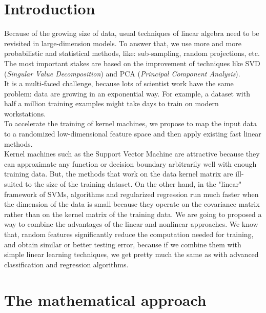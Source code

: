 \documentclass{article}
\begin{document}
\sloppy
{}


\section{Introduction}
Because of the growing size of data, usual techniques of linear algebra need to be revisited in large-dimension models. To answer that, we use more and more probabilistic and statistical methods, like: sub-sampling, random projections, etc. The most important stakes are based on the improvement of techniques like SVD (\textit{Singular Value Decomposition}) and PCA (\textit{Principal Component Analysis}). \\
It is a multi-faced challenge, because lots of scientist work have the same problem: data are growing in an exponential way.  For example, a dataset with half a million training examples might take days to train on modern workstations.\\
To accelerate the training of kernel machines, we propose to map the input data to a randomized low-dimensional feature space and then apply existing fast linear methods. \\

Kernel machines such as the Support Vector Machine are attractive because they can approximate any function or decision boundary arbitrarily well with enough training data. But, the methods that work on the data kernel matrix are ill-suited to the size of the training dataset. On the other hand, in the "linear" framework of SVMs, algorithms and regularized regression run much faster when the dimension of the data is small because they operate on the covariance matrix rather than on the kernel matrix of the training data. We are going to proposed a way to combine the advantages of the linear and nonlinear approaches. We know that, random features significantly reduce the computation needed for training, and obtain similar or better testing error, because if we combine them with simple linear learning techniques, we get pretty much the same as with advanced classification and regression algorithms.

\section{The mathematical approach}
\end{document}
